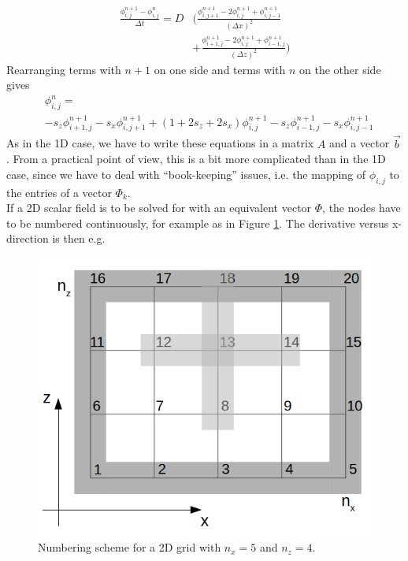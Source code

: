 \begin{align*}
\frac{\phi^{n+1}_{i,j}-\phi^{n}_{i,j}}{\Delta t} = D & ( \frac{\phi^{n+1}_{i,j+1}-2\phi^{n+1}_{i,j}+\phi^{n+1}_{i,j-1}}{(\Delta x)^2} \\ &+ \frac{\phi^{n+1}_{i+1,j}-2\phi^{n+1}_{i,j}+\phi^{n+1}_{i-1,j}}{(\Delta z)^2} )
\end{align*}
Rearranging terms with $n + 1$ on one side and terms with $n$ on the other side gives
\begin{align*}
&\phi^{n}_{i,j} = \\
&-s_z \phi^{n+1}_{i+1,j}-s_x \phi^{n+1}_{i,j+1} +(1+2s_z+2s_x) \phi^{n+1}_{i,j} -s_z \phi^{n+1}_{i-1,j}-s_x \phi^{n+1}_{i,j-1}
\label{eq:2Ddescrete}
\end{align*}
As in the 1D case, we have to write these equations in a matrix $A$ and a vector $\vec{b}$. From a practical point of view, this is a bit more complicated than in the 1D case, since we have to deal with “book-keeping” issues, i.e. the mapping of $\phi_{i,j}$ to the entries of a vector $\Phi_k$. 
\\
If a 2D scalar field is to be solved for with an equivalent vector $\Phi$, the nodes have to be numbered continuously, for example as in Figure \ref{fig:2d-grid-mapping}. The derivative versus x-direction is then e.g.

\begin{figure}[ht]\centering
\includegraphics[width=\linewidth]{2d-grid-mapping}
\caption{Numbering scheme for a 2D grid with $n_x = 5$ and $n_z = 4$.}
\label{fig:2d-grid-mapping}
\end{figure}

